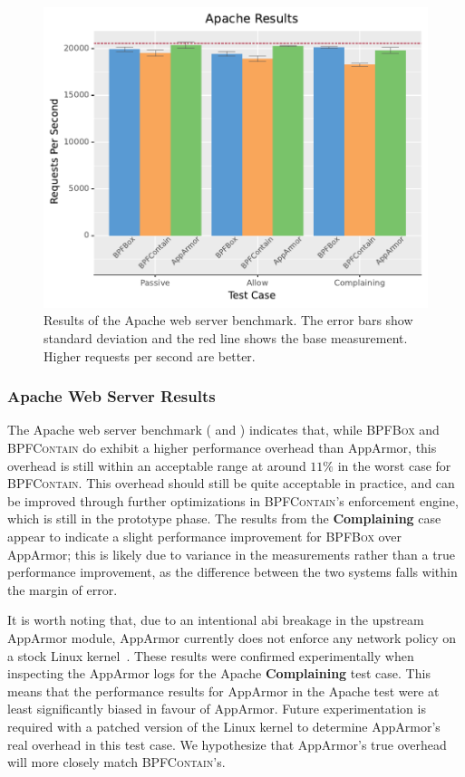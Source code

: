 \documentclass[
  fontsize=12pt,
  titlepage=firstiscover,
  paper=letter,
oneside,
  cleardoublepage=plain,
  parskip=half-,
  DIV=10,
  parindent,
  appendixprefix,
  chapterprefix,
  listof=totoc,
]{scrbook}
\newcommand{\bpfbox}{\textsc{BPFBox}}
\newcommand{\bpfcontain}{\textsc{BPFContain}}
\begin{document}
\begin{figure}[htp]
  \centering
  \includegraphics[width=0.6\linewidth]{results/graphs/Apache.pdf}
  \caption[Results of the Apache web server benchmark]{
    Results of the Apache web server benchmark.
    The error bars show standard deviation and the red line shows the base measurement.
    Higher requests per second are better.
  }\label{fig:phoronix-apache}
\end{figure}


\subsubsection{Apache Web Server Results}

The Apache web server benchmark ( and
) indicates that, while \bpfbox{} and \bpfcontain{} do exhibit
a higher performance overhead than AppArmor, this overhead is still within an acceptable
range at around $11\%$ in the worst case for \bpfcontain{}. This overhead should still be
quite acceptable in practice, and can be improved through further optimizations in
\bpfcontain{}'s enforcement engine, which is still in the prototype phase. The results
from the \textbf{Complaining} case appear to indicate a slight performance improvement for
\bpfbox{} over AppArmor; this is likely due to variance in the measurements rather than
a true performance improvement, as the difference between the two systems falls within the
margin of error.

It is worth noting that, due to an intentional \gls{abi} breakage in the upstream AppArmor
module, AppArmor currently does not enforce any network policy on a stock Linux
kernel~\cite{apparmor_net1, apparmor_net2}. These results were confirmed experimentally
when inspecting the AppArmor logs for the Apache \textbf{Complaining}  test case. This
means that the performance results for AppArmor in the Apache test were at least
significantly biased in favour of AppArmor.  Future experimentation is required with
a patched version of the Linux kernel to determine AppArmor's real overhead in this test
case. We hypothesize that AppArmor's true overhead will more closely match
\bpfcontain{}'s.
\end{document}
